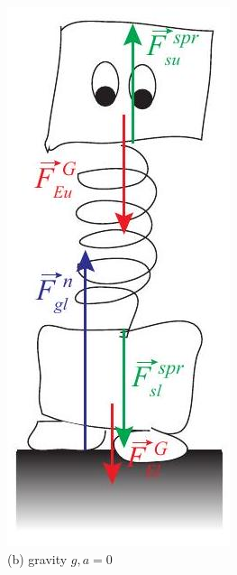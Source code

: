 \documentclass[10pt]{article}
\begin{document}
\includegraphics[max width=\textwidth, center]{2024_09_14_9969b06773f10b6936e8g-256(1)}\\
(b) gravity $g, a=0$
\end{document}
